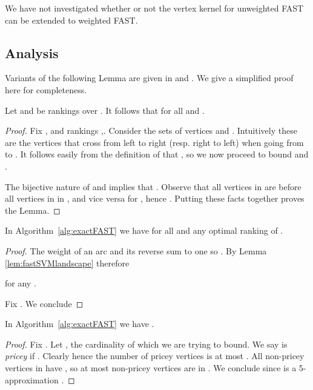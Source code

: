 \documentclass[envcountsame,oribibl]{llncs}
\begin{document}
We have not investigated whether or not the  vertex kernel for unweighted FAST \cite{Bessy09} can be extended to weighted FAST.

\subsection{Analysis}  \label{sec:fastAnalysis}

Variants of the following Lemma are given in \cite{Mathieu09fast} and \cite{Karpinski09betweenness}. We give a simplified proof here for completeness.

\begin{lemma}\label{lem:fastSVMlandscape}
Let  and  be rankings over . It follows that  for all  and .
\end{lemma}

\begin{proof}
Fix ,  and rankings ,. 
Consider the sets of vertices  and . Intuitively these are the vertices that cross  from left to right (resp. right to left) when going from  to . It follows easily from the definition of  that , so we now proceed to bound  and .

The bijective nature of  and  implies that . Observe that all vertices in  are before all vertices in  in , and vice versa for , hence . Putting these facts together proves the Lemma.
\end{proof}

\begin{lemma}\label{lem:feClose}
In Algorithm~\ref{alg:exactFAST} we have   for all  and any optimal ranking  of .
\end{lemma}
\begin{proof}
The weight of an arc and its reverse sum to one so . By Lemma \ref{lem:fastSVMlandscape} therefore 

for any .

Fix . We conclude

\end{proof}

\begin{lemma}\label{lem:psiSmallFAST}
In Algorithm~\ref{alg:exactFAST} we have .
\end{lemma}
\begin{proof}
Fix . Let , the cardinality of which we are trying to bound. We say  is \emph{pricey} if . Clearly  hence the number of pricey vertices is at most . All non-pricey vertices in  have , so at most  non-pricey vertices are in . We conclude  since  is a 5-approximation \cite{Coppersmith06}.
\end{proof}
\end{document}
